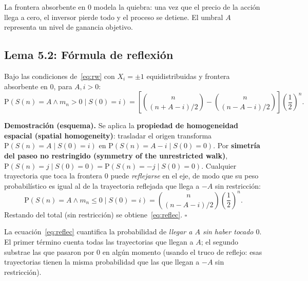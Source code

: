 \documentclass[12pt]{article}
\begin{document}
\begin{intuicion}
La frontera absorbente en $0$ modela la quiebra: una vez que el precio de la acci\'on
llega a cero, el inversor pierde todo y el proceso se detiene. El umbral $A$
representa un nivel de ganancia objetivo.
\end{intuicion}

\subsection{Lema 5.2: F\'ormula de reflexi\'on}

\begin{tcolorbox}[colback=gray!5, colframe=gray!50, title=\textbf{Lema~5.2}]
Bajo las condiciones de~\eqref{eq:rw} con $X_i = \pm 1$ equidistribuidas
y frontera absorbente en $0$, para $A, i > 0$:
\begin{equation}
  \mathrm{P}(S(n) = A \wedge m_n > 0 \mid S(0) = i)
  = \left[\binom{n}{(n+A-i)/2} - \binom{n}{(n-A-i)/2}\right]
    \!\left(\frac{1}{2}\right)^{\!n}.
  \label{eq:reflec}
\end{equation}
\end{tcolorbox}

\textbf{Demostraci\'on (esquema).}
Se aplica la \textbf{propiedad de homogeneidad espacial (spatial homogeneity)}:
trasladar el origen transforma $\mathrm{P}(S(n)=A \mid S(0)=i)$ en
$\mathrm{P}(S(n)=A-i \mid S(0)=0)$.
Por \textbf{simetr\'ia del paseo no restringido (symmetry of the unrestricted walk)},
$\mathrm{P}(S(n)=j \mid S(0)=0) = \mathrm{P}(S(n)=-j \mid S(0)=0)$.
Cualquier trayectoria que toca la frontera $0$ puede \emph{reflejarse} en el eje,
de modo que su peso probabil\'istico es igual al de la trayectoria reflejada
que llega a $-A$ sin restricci\'on:
\begin{equation*}
  \mathrm{P}(S(n) = A \wedge m_n \leq 0 \mid S(0)=i)
  = \binom{n}{(n-A-i)/2}\!\left(\frac{1}{2}\right)^{\!n}.
\end{equation*}
Restando del total (sin restricci\'on) se obtiene~\eqref{eq:reflec}. \hfill $\square$

\begin{intuicionmat}
La ecuaci\'on~\eqref{eq:reflec} cuantifica la probabilidad de \emph{llegar a $A$
sin haber tocado $0$}. El primer t\'ermino cuenta todas las trayectorias que llegan
a $A$; el segundo substrae las que pasaron por $0$ en alg\'un momento
(usando el truco de reflejo: esas trayectorias tienen la misma probabilidad que
las que llegan a $-A$ sin restricci\'on).
\end{intuicionmat}
\end{document}
